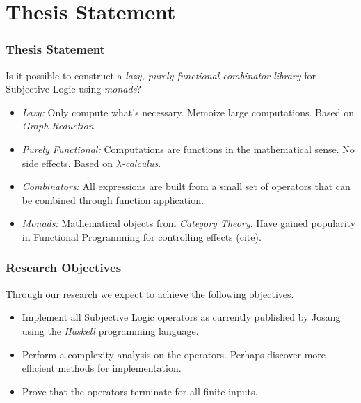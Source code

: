\documentclass{beamer}
\begin{document}
%
%

\section{Thesis Statement}

\begin{frame}
\frametitle{Thesis Statement}

Is it possible to construct a \emph{lazy, purely functional combinator library} for Subjective
Logic using \emph{monads}?

\begin{itemize}
  \item \emph{Lazy:} Only compute what's necessary. Memoize large computations. Based
    on \emph{Graph Reduction}.
  \item \emph{Purely Functional:} Computations are functions in the mathematical sense.
    No side effects. Based on \emph{$\lambda$-calculus}.
  \item \emph{Combinators:} All expressions are built from a small set of operators that
    can be combined through function application.
  \item \emph{Monads:} Mathematical objects from \emph{Category Theory}. Have gained
    popularity in Functional Programming for controlling effects (cite).
\end{itemize}

\end{frame}


\begin{frame}
\frametitle{Research Objectives}

Through our research we expect to achieve the following objectives.

\begin{itemize}
  \item Implement all Subjective Logic operators as currently published by Josang
    using the \emph{Haskell} programming language.
  \item Perform a complexity analysis on the operators. Perhaps discover more efficient
    methods for implementation.
  \item Prove that the operators terminate for all finite inputs.
\end{itemize}

\end{frame}
\end{document}
